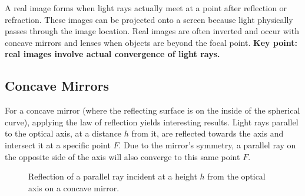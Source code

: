 \documentclass[
  a4paper,
]{book}
\begin{document}
\begin{tcolorbox}[enhanced jigsaw, coltitle=black, title=\textcolor{quarto-callout-note-color}{\faInfo}\hspace{0.5em}{Real Images}, colframe=quarto-callout-note-color-frame, toprule=.15mm, opacitybacktitle=0.6, left=2mm, opacityback=0, breakable, toptitle=1mm, bottomtitle=1mm, leftrule=.75mm, arc=.35mm, titlerule=0mm, colbacktitle=quarto-callout-note-color!10!white, rightrule=.15mm, bottomrule=.15mm, colback=white]

A real image forms when light rays actually meet at a point after
reflection or refraction. These images can be projected onto a screen
because light physically passes through the image location. Real images
are often inverted and occur with concave mirrors and lenses when
objects are beyond the focal point. \textbf{Key point: real images
involve actual convergence of light rays.}

\end{tcolorbox}

\subsection{Concave Mirrors}\label{concave-mirrors}

For a concave mirror (where the reflecting surface is on the inside of
the spherical curve), applying the law of reflection yields interesting
results. Light rays parallel to the optical axis, at a distance \(h\)
from it, are reflected towards the axis and intersect it at a specific
point \(F\). Due to the mirror's symmetry, a parallel ray on the
opposite side of the axis will also converge to this same point \(F\).

\begin{figure}


\caption{\label{fig-concave-mirror-ray}Reflection of a parallel ray
incident at a height \(h\) from the optical axis on a concave mirror.}

\end{figure}%
\end{document}
